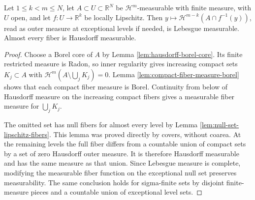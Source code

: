\begin{lemma}\label{lem:finite-hausdorff-fiber-measurable}
Let $1\leq k<m\leq N$, let $A\subset U\subset\mathbb R^N$ be $\mathcal H^m$-measurable with finite measure, with $U$ open, and let $f:U\to\mathbb R^k$ be locally Lipschitz. Then $y\mapsto\mathcal H^{m-k}(A\cap f^{-1}(y))$, read as outer measure at exceptional levels if needed, is Lebesgue measurable. Almost every fiber is Hausdorff measurable.
\end{lemma}
\begin{proof}
Choose a Borel core of $A$ by Lemma \ref{lem:hausdorff-borel-core}. Its finite restricted measure is Radon, so inner regularity gives increasing compact sets $K_j\subset A$ with $\mathcal H^m(A\setminus\bigcup_jK_j)=0$. Lemma \ref{lem:compact-fiber-measure-borel} shows that each compact fiber measure is Borel. Continuity from below of Hausdorff measure on the increasing compact fibers gives a measurable fiber measure for $\bigcup_jK_j$.

The omitted set has null fibers for almost every level by Lemma \ref{lem:null-set-lipschitz-fibers}. This lemma was proved directly by covers, without coarea. At the remaining levels the full fiber differs from a countable union of compact sets by a set of zero Hausdorff outer measure. It is therefore Hausdorff measurable and has the same measure as that union. Since Lebesgue measure is complete, modifying the measurable fiber function on the exceptional null set preserves measurability. The same conclusion holds for sigma-finite sets by disjoint finite-measure pieces and a countable union of exceptional level sets.
\end{proof}

